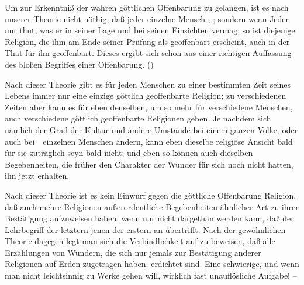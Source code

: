 \begin{aufza}
\item Um zur Erkenntniß der wahren göttlichen Offenbarung zu gelangen, ist es nach unserer Theorie nicht nöthig, daß jeder einzelne Mensch , \usw ; sondern wenn Jeder nur thut, was er in seiner Lage und bei seinen Einsichten vermag; so ist diejenige Religion, die ihm am Ende seiner Prüfung als geoffenbart erscheint, auch in der That für ihn geoffenbart. Dieses ergibt sich schon aus einer richtigen Auffassung des bloßen Begriffes einer Offenbarung. ()
\item Nach dieser Theorie gibt es für jeden Menschen zu einer bestimmten Zeit seines Lebens immer nur eine einzige göttlich geoffenbarte Religion; zu verschiedenen Zeiten aber kann es für eben denselben, um so mehr für verschiedene Menschen, auch verschiedene göttlich geoffenbarte Religionen geben. Je nachdem sich nämlich der Grad der Kultur und andere Umstände bei einem ganzen Volke, oder auch bei~\ einzelnen Menschen ändern, kann eben dieselbe religiöse Ansicht bald für sie zuträglich seyn bald nicht; und eben so können auch dieselben Begebenheiten, die früher den Charakter der Wunder für sich noch nicht hatten, ihn jetzt erhalten.
\item Nach dieser Theorie ist es kein Einwurf gegen die göttliche Offenbarung  Religion, daß auch mehre  Religionen außerordentliche Begebenheiten ähnlicher Art zu ihrer Bestätigung aufzuweisen haben; wenn nur nicht dargethan werden kann, daß der Lehrbegriff der letztern jenen der erstern an  übertrifft. Nach der gewöhnlichen Theorie dagegen legt man sich die Verbindlichkeit auf zu beweisen, daß alle Erzählungen von Wundern, die sich nur jemals zur Bestätigung anderer Religionen auf Erden zugetragen haben, erdichtet sind. Eine schwierige, und wenn man nicht leichtsinnig zu Werke gehen will, wirklich fast unauflösliche Aufgabe! --~
\end{aufza}

\endinput